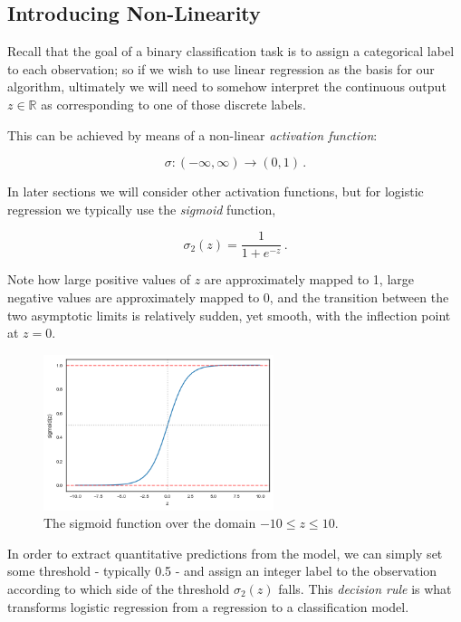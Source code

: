 \documentclass{article}[11pt]
\begin{document}
    \subsection{Introducing Non-Linearity}
        
        Recall that the goal of a binary classification task is to assign a categorical label to each observation; so if we wish to use linear regression as the basis for our algorithm, ultimately we will need to somehow interpret the continuous output $z \in \mathbb{R}$ as corresponding to one of those discrete labels.
        
        This can be achieved by means of a non-linear \textit{activation function}:
        
        $$
        \sigma \colon (-\infty, \infty) \to (0, 1) \,.
        $$
        
        In later sections we will consider other activation functions, but for logistic regression we typically use the \textit{sigmoid} function,
            
        $$
        \sigma_2(z) = \frac{1}{1 + e^{-z}} \,.
        $$
        
        Note how large positive values of $z$ are approximately mapped to 1, large negative values are approximately mapped to 0, and the transition between the two asymptotic limits is relatively sudden, yet smooth, with the inflection point at $z = 0$.     
        
           
        \begin{figure}[h]
            \includegraphics[width=0.6\textwidth, center]{sigmoid}
            \caption{The sigmoid function over the domain $-10 \leq z \leq 10$.}
            \label{fig:sigmoid}
        \end{figure}
        
        In order to extract quantitative predictions from the model, we can simply set some threshold - typically 0.5 - and assign an integer label to the observation according to which side of the threshold $\sigma_2(z)$ falls. This \textit{decision rule} is what transforms logistic regression from a regression to a classification model.
        
\end{document}
